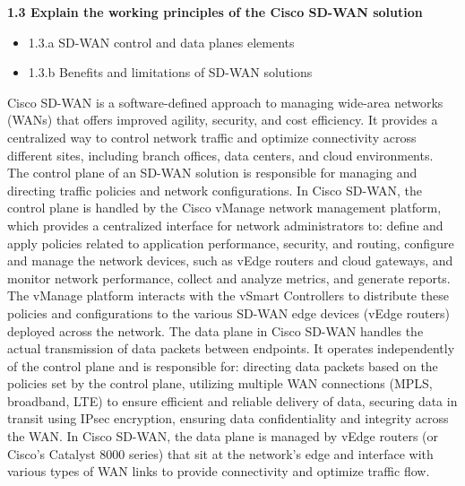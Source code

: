 \documentclass{article}
\begin{document}
\textbf{1.3 Explain the working principles of the Cisco SD-WAN solution}
\begin{itemize}
\item 1.3.a SD-WAN control and data planes elements
\item 1.3.b Benefits and limitations of SD-WAN solutions
\end{itemize}

	Cisco SD-WAN is a software-defined approach to managing wide-area networks (WANs) that offers improved agility, security, and cost efficiency. It provides a centralized way to control network traffic and optimize connectivity across different sites, including branch offices, data centers, and cloud environments. The control plane of an SD-WAN solution is responsible for managing and directing traffic policies and network configurations. In Cisco SD-WAN, the control plane is handled by the Cisco vManage network management platform, which provides a centralized interface for network administrators to: define and apply policies related to application performance, security, and routing, configure and manage the network devices, such as vEdge routers and cloud gateways, and monitor network performance, collect and analyze metrics, and generate reports. The vManage platform interacts with the vSmart Controllers to distribute these policies and configurations to the various SD-WAN edge devices (vEdge routers) deployed across the network. The data plane in Cisco SD-WAN handles the actual transmission of data packets between endpoints. It operates independently of the control plane and is responsible for: directing data packets based on the policies set by the control plane, utilizing multiple WAN connections (MPLS, broadband, LTE) to ensure efficient and reliable delivery of data, securing data in transit using IPsec encryption, ensuring data confidentiality and integrity across the WAN. In Cisco SD-WAN, the data plane is managed by vEdge routers (or Cisco’s Catalyst 8000 series) that sit at the network’s edge and interface with various types of WAN links to provide connectivity and optimize traffic flow.\\
\end{document}
